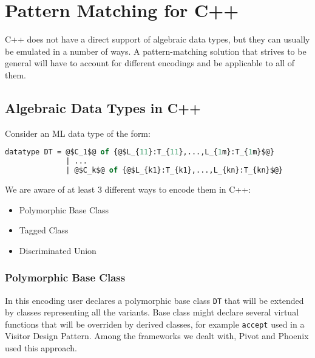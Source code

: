 \documentclass[preprint]{sigplanconf}
\DeclareRobustCommand{\code}[1]{{\lstinline[breaklines=false]{#1}}}
\begin{document}

\section{Pattern Matching for C++} %
\label{sec:pm}

C++ does not have a direct support of algebraic data types, but they can usually 
be emulated in a number of ways. A pattern-matching solution that strives to be 
general will have to account for different encodings and be applicable to all of 
them.

\subsection{Algebraic Data Types in C++}

Consider an ML data type of the form:

\begin{lstlisting}[language=ML,keepspaces,columns=flexible,escapechar=@]
datatype DT = @$C_1$@ of {@$L_{11}:T_{11},...,L_{1m}:T_{1m}$@} 
              | ...
              | @$C_k$@ of {@$L_{k1}:T_{k1},...,L_{kn}:T_{kn}$@}
\end{lstlisting}

\noindent We are aware of at least 3 different ways to encode them in C++:

\begin{itemize}
\item Polymorphic Base Class
\item Tagged Class
\item Discriminated Union
\end{itemize}

\subsubsection{Polymorphic Base Class}

In this encoding user declares a polymorphic base class \code{DT} that will 
be extended by classes representing all the variants. Base class might declare 
several virtual functions that will be overriden by derived classes, for example 
\code{accept} used in a Visitor Design Pattern. Among the frameworks we dealt 
with, Pivot\cite{Pivot09} and Phoenix\cite{Phoenix} used this approach.
\end{document}
